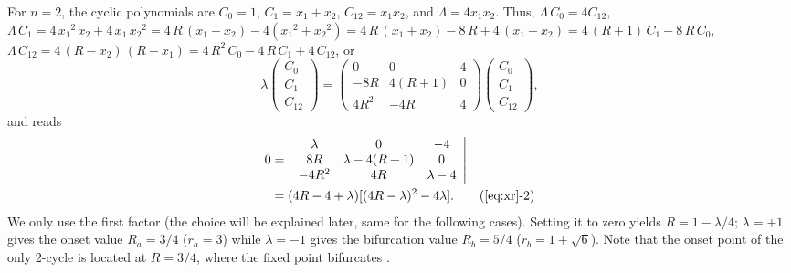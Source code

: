 \documentclass[twocolumn]{revtex4-1}
\begin{document}
For $n = 2$, the cyclic polynomials are
$C_0 = 1$,
$C_1 = x_1 + x_2$,
$C_{12} = x_1 x_2$,
and $\Lambda = 4 x_1 x_2$.
Thus,
$\Lambda \, C_0 = 4 C_{12}$,
$\Lambda \, C_1 = 4 \, {x_1}^2 \, x_2 + 4 \, x_1 \, {x_2}^2
  = 4 \, R \, (x_1 + x_2) - 4 ({x_1}^2 + {x_2}^2)
  = 4 \, R \, (x_1 + x_2) - 8 \, R + 4 \, (x_1 + x_2)
  = 4 \, (R + 1) \, C_1 - 8 \, R \, C_0$,
$\Lambda \, C_{12}
  = 4 \, (R-x_2)\, (R-x_1)
  = 4\, R^2  \, C_0 - 4 \, R \, C_1 + 4 \, C_{12}$,
or
\[
\lambda
  \left( \begin{array}{c}
  C_0 \\
  C_1 \\
  C_{12}
  \end{array} \right)
 =
  \left( \begin{array}{ccc}
  0           & 0         & 4 \\
  -8R         & 4(R+1)    & 0 \\
  4R^2        & -4R       & 4
  \end{array} \right)
  \left( \begin{array}{c}
  C_0 \\
  C_1 \\
  C_{12}
  \end{array} \right),
\]
%
%
%
and  reads
%
%
%
\begin{align}
0 &=
  \left| \begin{array}{ccc}
  \lambda     & 0               & -4 \\
  8R          & \lambda-4(R+1)  & 0 \\
  -4R^2       & 4R              & \lambda-4
  \end{array} \right| \nonumber\\
  &= (4R - 4 + \lambda) [(4 R-\lambda)^2 - 4 \lambda].
  \tag{\ref{eq:xr}-2}
\label{eq:xr2}
\end{align}
%
%
%
We only use the first factor
(the choice will be explained later, same for the following cases).
%
Setting it to zero yields $R = 1 - \lambda/4$;
$\lambda = +1$ gives the onset value $R_a = 3/4$ ($r_a = 3$)
while
$\lambda = -1$ gives the bifurcation value $R_b = 5/4$ ($r_b = 1+\sqrt 6$).
%
Note that the onset point of the only 2-cycle
  is located at $R = 3/4$,
  where the fixed point bifurcates \cite{strogatz}
  .
\end{document}

